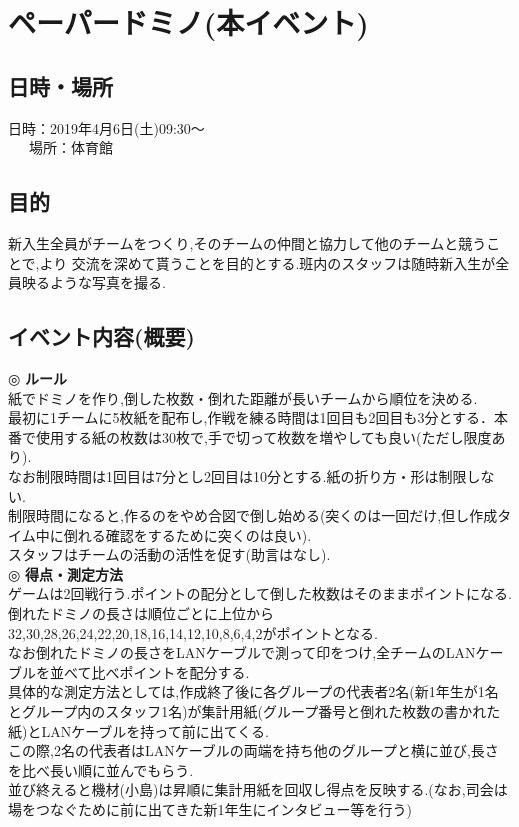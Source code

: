 \documentclass[a4j]{jarticle}
\begin{document}
\section{ペーパードミノ(本イベント)}
\subsection{日時・場所}
日時：2019年4月6日(土)09:30〜\\
\ \ \ 場所：体育館\\
\subsection{目的}
新入生全員がチームをつくり,そのチームの仲間と協力して他のチームと競うことで,より
交流を深めて貰うことを目的とする.班内のスタッフは随時新入生が全員映るような写真を撮る. \vspace{-3mm} \\

\subsection{イベント内容(概要)}

◎ \textbf{ルール} \\
紙でドミノを作り,倒した枚数・倒れた距離が長いチームから順位を決める.\\
最初に1チームに5枚紙を配布し,作戦を練る時間は1回目も2回目も3分とする．本番で使用する紙の枚数は30枚で,手で切って枚数を増やしても良い(ただし限度あり). \\
なお制限時間は1回目は7分とし2回目は10分とする.紙の折り方・形は制限しない. \\
制限時間になると,作るのをやめ合図で倒し始める(突くのは一回だけ,但し作成タイム中に倒れる確認をするために突くのは良い). \\
スタッフはチームの活動の活性を促す(助言はなし).\\

◎ \textbf{得点・測定方法} \\
ゲームは2回戦行う.ポイントの配分として倒した枚数はそのままポイントになる.\\
倒れたドミノの長さは順位ごとに上位から32,30,28,26,24,22,20,18,16,14,12,10,8,6,4,2がポイントとなる.\\
なお倒れたドミノの長さをLANケーブルで測って印をつけ,全チームのLANケーブルを並べて比べポイントを配分する.\\
具体的な測定方法としては,作成終了後に各グループの代表者2名(新1年生が1名とグループ内のスタッフ1名)が集計用紙(グループ番号と倒れた枚数の書かれた紙)とLANケーブルを持って前に出てくる.\\
この際,2名の代表者はLANケーブルの両端を持ち他のグループと横に並び,長さを比べ長い順に並んでもらう.\\
並び終えると機材(小島)は昇順に集計用紙を回収し得点を反映する.(なお,司会は場をつなぐために前に出てきた新1年生にインタビュー等を行う) \\
\end{document}
